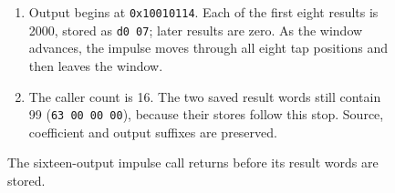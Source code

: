 \begin{figure}[htbp]
\begin{minipage}{\linewidth}
\begin{enumerate}
      \item Output begins at \texttt{0x10010114}. Each of the first eight results is 2000, stored as \texttt{d0 07}; later results are zero. As the window advances, the impulse moves through all eight tap positions and then leaves the window.
      \item The caller count is 16. The two saved result words still contain 99 (\texttt{63 00 00 00}), because their stores follow this stop. Source, coefficient and output suffixes are preserved.
    \end{enumerate}
  \end{minipage}
  \caption{The sixteen-output impulse call returns before its result words are stored.}
  \label{capture:021-fixed-point-fir-f01}
  \label{fir-f01}
\end{figure}
\par
